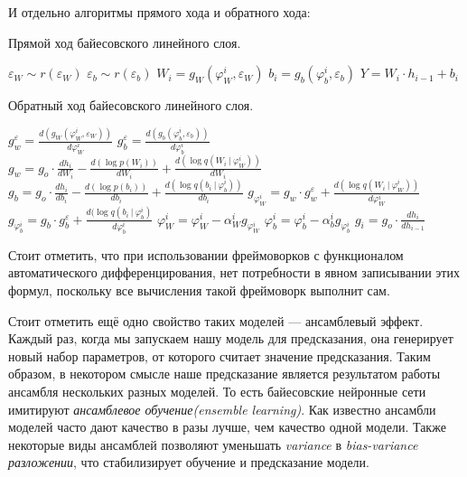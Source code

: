 И отдельно алгоритмы прямого хода и обратного хода:
\begin{algorithm}
\caption{Прямой ход байесовского линейного слоя.}
\begin{algorithmic}
    \State $\varepsilon_W \sim r(\varepsilon_W)$
    \State $\varepsilon_b \sim r(\varepsilon_b)$
    \State $W_i = g_{W}(\varphi_W^i, \varepsilon_W)$
    \State $b_i = g_{b}(\varphi_b^i, \varepsilon_b)$
    \State $Y = W_i \cdot h_{i-1} + b_i$
    \State {}
\EndProcedure
\end{algorithmic}
\end{algorithm}
\begin{algorithm}
\caption{Обратный ход байесовского линейного слоя.}
\begin{algorithmic}
    \State $g_w^\varepsilon = \frac{d(g_{W}(\varphi_W^i, \varepsilon_W))}{d \varphi_W^i}$
    \State $g_b^\varepsilon = \frac{d(g_{b}(\varphi_b^i, \varepsilon_b))}{d \varphi_b^i}$
    \State $g_w = g_o \cdot \frac{dh_i}{dW_i} - \frac{d(\log p(W_i))}{dW_i} + \frac{d(\log q(W_i\ |\ \varphi_W^i))}{dW_i}$
    \State $g_b = g_o \cdot \frac{dh_i}{db_i} - \frac{d(\log p(b_i))}{db_i} + \frac{d(\log q(b_i\ |\ \varphi_b^i))}{db_i}$
    \State $g_{\varphi_W^i} = g_w \cdot g_w^\varepsilon + \frac{d(\log q(W_i\ |\ \varphi_W^i))}{d\varphi_W^i}$
    \State $g_{\varphi_b^i} = g_b \cdot g_b^\varepsilon + \frac{d(\log q(b_i\ |\ \varphi_b^i)}{d\varphi_b^i}$
    \State $\varphi_W^i = \varphi_W^i - \alpha_W^i g_{\varphi_W^i}$
    \State $\varphi_b^i = \varphi_b^i - \alpha_b^i g_{\varphi_b^i}$
    \State $g_i = g_o \cdot \frac{dh_i}{dh_{i-1}}$
    \State {}
\EndProcedure
\end{algorithmic}
\end{algorithm}

Стоит отметить, что при использовании фреймоворков с функционалом автоматического дифференцирования, нет потребности в явном записывании этих формул,
 поскольку все вычисления такой фреймоворк выполнит сам.

Стоит отметить ещё одно свойство таких моделей --- ансамблевый эффект. Каждый раз, когда мы запускаем нашу модель для предсказания, она
 генерирует новый набор параметров, от которого считает значение предсказания. Таким образом, в некотором смысле наше предсказание является
 результатом работы ансамбля нескольких разных моделей. То есть байесовские нейронные сети имитируют \textit{ансамблевое обучение(ensemble learning)}.
 Как известно ансамбли моделей часто дают качество в разы лучше, чем качество одной модели. Также некоторые виды ансамблей позволяют уменьшать
 \textit{variance} в \textit{bias-variance разложении}, что стабилизирует обучение и предсказание модели.
